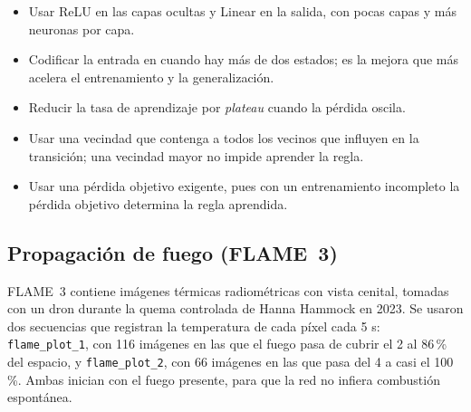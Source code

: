 \begin{itemize}
	\item Usar ReLU en las capas ocultas y Linear en la salida, con pocas capas y más neuronas por capa.
	\item Codificar la entrada en \onehot{} cuando hay más de dos estados; es la mejora que más acelera el entrenamiento y la generalización.
	\item Reducir la tasa de aprendizaje por \textit{plateau} cuando la pérdida oscila.
	\item Usar una vecindad que contenga a todos los vecinos que influyen en la transición; una vecindad mayor no impide aprender la regla.
	\item Usar una pérdida objetivo exigente, pues con un entrenamiento incompleto la pérdida objetivo determina la regla aprendida.
\end{itemize}

\subsection{Propagación de fuego (FLAME~3)}

FLAME~3 \cite{hopkins2024flame3datasetunleashing} contiene imágenes térmicas radiométricas con vista cenital, tomadas con un dron durante la quema controlada de Hanna Hammock en 2023. Se usaron dos secuencias que registran la temperatura de cada píxel cada 5 s: \texttt{flame\_plot\_1}, con 116 imágenes en las que el fuego pasa de cubrir el 2 al 86\,\% del espacio, y \texttt{flame\_plot\_2}, con 66 imágenes en las que pasa del 4 a casi el 100\,\%. Ambas inician con el fuego presente, para que la red no infiera combustión espontánea.

